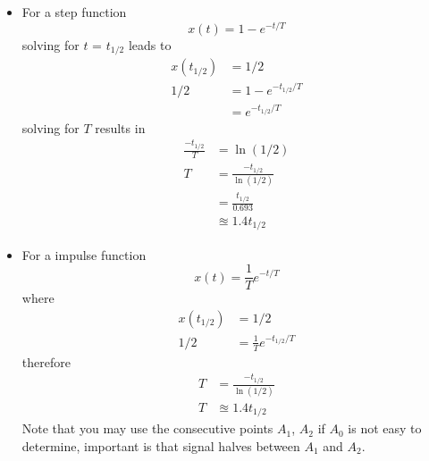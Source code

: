 \documentclass[12pt,letter]{article}
\numberwithin{ex}{section} %
\numberwithin{re}{section} %
\numberwithin{equation}{section}	%
\begin{document}
\begin{itemize}
\begin{figure}[H]
\end{figure}
\begin{itemize}
\item For a step function
\begin{equation}
x(t) = 1-e^{-t/T}
\end{equation}
solving for $t$ = $t_{1/2}$ leads to
\begin{align}
x(t_{1/2}) &= 1/2 \\
1/2 &= 1-e^{-t_{1/2}/T} \nonumber \\
&= e^{-t_{1/2}/T} \nonumber
\end{align}
solving for $T$ results in
\begin{align}
\frac{-t_{1/2}}{T} &= \ln(1/2) \\
T &= \frac{-t_{1/2}}{\ln(1/2)} \nonumber \\
 &= \frac{t_{1/2}}{0.693} \nonumber \\
 &\approxeq 1.4 t_{1/2} \nonumber 
\end{align} 
\item For a impulse function
\begin{equation}
x(t) = \frac{1}{T}e^{-t/T}
\end{equation}
where
\begin{align}
x(t_{1/2}) &= 1/2 \\
1/2 &= \frac{1}{T}e^{-t_{1/2}/T} \nonumber
\end{align}
therefore
\begin{align}
T &= \frac{-t_{1/2}}{\ln(1/2)} \nonumber \\
T &\approxeq 1.4 t_{1/2} \nonumber 
\end{align} 
Note that you may use the consecutive points $A_1$, $A_2$ if $A_0$ is not easy to determine, important is that signal halves between $A_1$ and $A_2$. 




\end{itemize}
\end{itemize}
\end{document}

